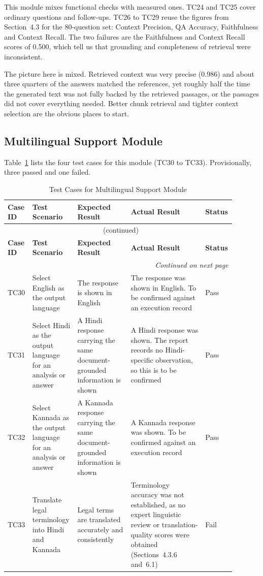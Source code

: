 \documentclass[12pt,a4paper,oneside]{report}
\begin{document}
This module mixes functional checks with measured ones. TC24 and TC25 cover ordinary questions and follow-ups. TC26 to TC29 reuse the figures from Section~4.3 for the 80-question set: Context Precision, QA Accuracy, Faithfulness and Context Recall. The two failures are the Faithfulness and Context Recall scores of 0.500, which tell us that grounding and completeness of retrieval were inconsistent.

The picture here is mixed. Retrieved context was very precise (0.986) and about three quarters of the answers matched the references, yet roughly half the time the generated text was not fully backed by the retrieved passages, or the passages did not cover everything needed. Better chunk retrieval and tighter context selection are the obvious places to start.

\subsection{Multilingual Support Module}
Table~\ref{tab:multi} lists the four test cases for this module (TC30 to TC33). Provisionally, three passed and one failed.
{\footnotesize
\setlength{\tabcolsep}{3pt}
\renewcommand{\arraystretch}{1.15}
\begin{longtable}{|p{0.075\linewidth}|p{0.19\linewidth}|p{0.23\linewidth}|p{0.32\linewidth}|p{0.08\linewidth}|}
\caption{Test Cases for Multilingual Support Module}\label{tab:multi}\\
\hline
\textbf{Case ID} & \textbf{Test Scenario} & \textbf{Expected Result} & \textbf{Actual Result} & \textbf{Status}\\
\hline
\endfirsthead
\multicolumn{5}{c}{\tablename~\thetable{} (continued)}\\
\hline
\textbf{Case ID} & \textbf{Test Scenario} & \textbf{Expected Result} & \textbf{Actual Result} & \textbf{Status}\\
\hline
\endhead
\hline
\multicolumn{5}{r}{\emph{Continued on next page}}\\
\endfoot
\hline
\endlastfoot
TC30 & Select English as the output language & The response is shown in English & The response was shown in English. To be confirmed against an execution record & Pass\\
\hline
TC31 & Select Hindi as the output language for an analysis or answer & A Hindi response carrying the same document-grounded information is shown & A Hindi response was shown. The report records no Hindi-specific observation, so this is to be confirmed & Pass\\
\hline
TC32 & Select Kannada as the output language for an analysis or answer & A Kannada response carrying the same document-grounded information is shown & A Kannada response was shown. To be confirmed against an execution record & Pass\\
\hline
TC33 & Translate legal terminology into Hindi and Kannada & Legal terms are translated accurately and consistently & Terminology accuracy was not established, as no expert linguistic review or translation-quality scores were obtained (Sections~4.3.6 and~6.1) & Fail\\
\end{longtable}
}
\end{document}
